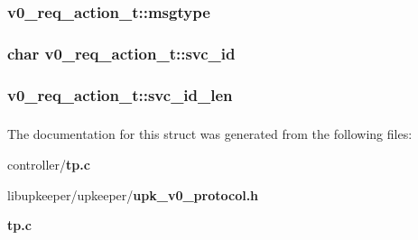 \subsubsection[{msgtype}]{ {\bf v0\_\-req\_\-action\_\-t::msgtype}}\label{structv0__req__action__t_ac456f9a58ae398102a49c9dac19d3790}
\subsubsection[{svc\_\-id}]{\setlength{\rightskip}{0pt plus 5cm}char {\bf v0\_\-req\_\-action\_\-t::svc\_\-id}}\label{structv0__req__action__t_a362b3cafa48a623bae5f627a9e58d0df}
\subsubsection[{svc\_\-id\_\-len}]{ {\bf v0\_\-req\_\-action\_\-t::svc\_\-id\_\-len}}\label{structv0__req__action__t_a9efefc29f0ec6e1905fc26e3d4bffc18}
\subsubsection[{UPK\_\-V0\_\-REQ\_\-ACTION\_\-T\_\-FIELDS}]{}\label{structv0__req__action__t_aaad19b60b6f16c89134e934bfbc953f0}


The documentation for this struct was generated from the following files:\begin{DoxyCompactItemize}
\item 
controller/{\bf tp.c}\item 
libupkeeper/upkeeper/{\bf upk\_\-v0\_\-protocol.h}\item 
{\bf tp.c}\end{DoxyCompactItemize}
